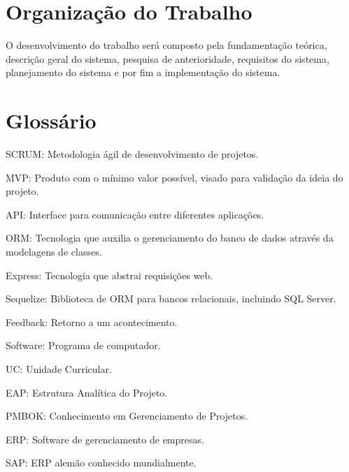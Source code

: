 \section{Organização do Trabalho}

O desenvolvimento do trabalho será composto pela fundamentação teórica, descrição geral do sistema, pesquisa de anterioridade, requisitos do sistema, planejamento do sistema e por fim a implementação do sistema.

\section{Glossário}
SCRUM:		Metodologia ágil de desenvolvimento de projetos.

MVP:		Produto com o mínimo valor possível, visado para validação da ideia do projeto.

API:		Interface para comunicação entre diferentes aplicações.

ORM:		Tecnologia que auxilia o gerenciamento do banco de dados através da modelagens de classes.

Express:	Tecnologia que abstrai requisições web.

Sequelize:	Biblioteca de ORM para bancos relacionais, incluindo SQL Server.

Feedback:	Retorno a um acontecimento.

Software:	Programa de computador.

UC:			Unidade Curricular.

EAP:		Estrutura Analítica do Projeto.

PMBOK:      Conhecimento em Gerenciamento de Projetos.

ERP:        Software de gerenciamento de empresas.

SAP:        ERP alemão conhecido mundialmente.






